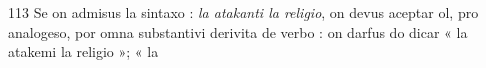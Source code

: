 \begin{VUpage}[117]{113}
Se on admisus la sintaxo : \textit{la atakanti la religio}, on devus\nl
aceptar ol, pro analogeso, por omna substantivi derivita de\nl
verbo : on darfus do dicar « la atakemi la religio »; « la\parplein
\end{VUpage}

